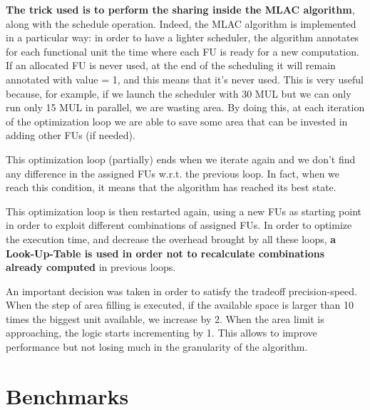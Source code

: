 \documentclass{article}
\begin{document}
  \textbf{The trick used is to perform the sharing inside the MLAC algorithm}, along with the schedule operation. Indeed, the MLAC algorithm is implemented in a particular way: in order to have a lighter scheduler, the algorithm annotates for each functional unit the time where each FU is ready for a new computation. If an allocated FU is never used, at the end of the scheduling it will remain annotated with value = 1, and this means that it's never used. This is very useful because, for example, if we launch the scheduler with 30 MUL but we can only run only 15 MUL in parallel, we are wasting area. By doing this, at each iteration of the optimization loop we are able to save some area that can be invested in adding other FUs (if needed).

  This optimization loop (partially) ends when we iterate again and we don't find any difference in the assigned FUs w.r.t. the previous loop. In fact, when we reach this condition, it means that the algorithm has reached its best state. 

  This optimization loop is then restarted again, using a new FUs as starting point in order to exploit different combinations of assigned FUs. In order to optimize the execution time, and decrease the overhead brought by all these loops, \textbf{a Look-Up-Table is used in order not to recalculate combinations already computed} in previous loops. 

  An important decision was taken in order to satisfy the tradeoff precision-speed. When the step of area filling is executed, if the available space is larger than 10 times the biggest unit available, we increase by 2. When the area limit is approaching, the logic starts incrementing by 1. This allows to improve performance but not losing much in the granularity of the algorithm. 

  \newpage

  \section{Benchmarks}

\end{document}
